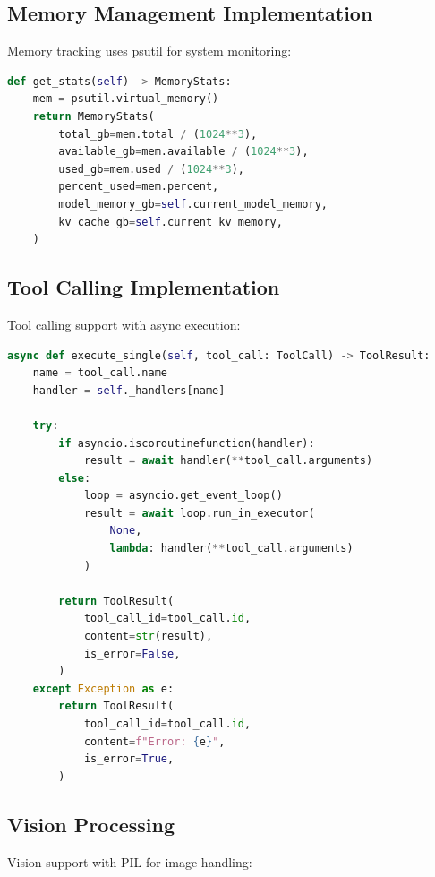 \subsection{Memory Management Implementation}

Memory tracking uses psutil for system monitoring:

\begin{lstlisting}[language=Python, caption=Memory Monitoring]
def get_stats(self) -> MemoryStats:
    mem = psutil.virtual_memory()
    return MemoryStats(
        total_gb=mem.total / (1024**3),
        available_gb=mem.available / (1024**3),
        used_gb=mem.used / (1024**3),
        percent_used=mem.percent,
        model_memory_gb=self.current_model_memory,
        kv_cache_gb=self.current_kv_memory,
    )
\end{lstlisting}

\subsection{Tool Calling Implementation}

Tool calling support with async execution:

\begin{lstlisting}[language=Python, caption=Tool Execution]
async def execute_single(self, tool_call: ToolCall) -> ToolResult:
    name = tool_call.name
    handler = self._handlers[name]
    
    try:
        if asyncio.iscoroutinefunction(handler):
            result = await handler(**tool_call.arguments)
        else:
            loop = asyncio.get_event_loop()
            result = await loop.run_in_executor(
                None,
                lambda: handler(**tool_call.arguments)
            )
        
        return ToolResult(
            tool_call_id=tool_call.id,
            content=str(result),
            is_error=False,
        )
    except Exception as e:
        return ToolResult(
            tool_call_id=tool_call.id,
            content=f"Error: {e}",
            is_error=True,
        )
\end{lstlisting}

\subsection{Vision Processing}

Vision support with PIL for image handling:

